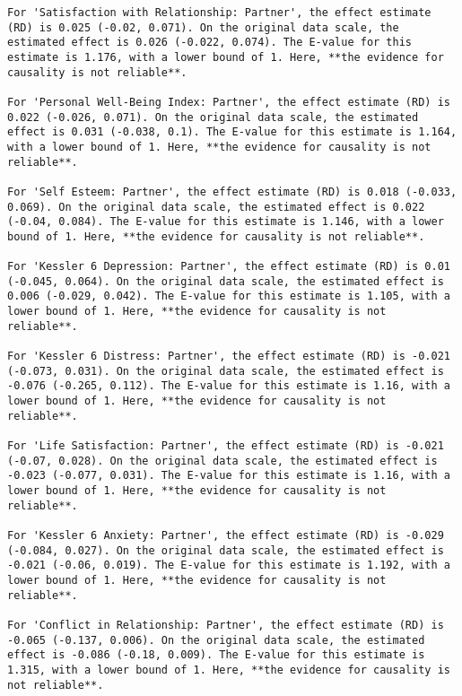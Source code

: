 \documentclass[
  singlecolumn]{article}
\begin{document}
\begin{verbatim}
For 'Satisfaction with Relationship: Partner', the effect estimate (RD) is 0.025 (-0.02, 0.071). On the original data scale, the estimated effect is 0.026 (-0.022, 0.074). The E-value for this estimate is 1.176, with a lower bound of 1. Here, **the evidence for causality is not reliable**.

For 'Personal Well-Being Index: Partner', the effect estimate (RD) is 0.022 (-0.026, 0.071). On the original data scale, the estimated effect is 0.031 (-0.038, 0.1). The E-value for this estimate is 1.164, with a lower bound of 1. Here, **the evidence for causality is not reliable**.

For 'Self Esteem: Partner', the effect estimate (RD) is 0.018 (-0.033, 0.069). On the original data scale, the estimated effect is 0.022 (-0.04, 0.084). The E-value for this estimate is 1.146, with a lower bound of 1. Here, **the evidence for causality is not reliable**.

For 'Kessler 6 Depression: Partner', the effect estimate (RD) is 0.01 (-0.045, 0.064). On the original data scale, the estimated effect is 0.006 (-0.029, 0.042). The E-value for this estimate is 1.105, with a lower bound of 1. Here, **the evidence for causality is not reliable**.

For 'Kessler 6 Distress: Partner', the effect estimate (RD) is -0.021 (-0.073, 0.031). On the original data scale, the estimated effect is -0.076 (-0.265, 0.112). The E-value for this estimate is 1.16, with a lower bound of 1. Here, **the evidence for causality is not reliable**.

For 'Life Satisfaction: Partner', the effect estimate (RD) is -0.021 (-0.07, 0.028). On the original data scale, the estimated effect is -0.023 (-0.077, 0.031). The E-value for this estimate is 1.16, with a lower bound of 1. Here, **the evidence for causality is not reliable**.

For 'Kessler 6 Anxiety: Partner', the effect estimate (RD) is -0.029 (-0.084, 0.027). On the original data scale, the estimated effect is -0.021 (-0.06, 0.019). The E-value for this estimate is 1.192, with a lower bound of 1. Here, **the evidence for causality is not reliable**.

For 'Conflict in Relationship: Partner', the effect estimate (RD) is -0.065 (-0.137, 0.006). On the original data scale, the estimated effect is -0.086 (-0.18, 0.009). The E-value for this estimate is 1.315, with a lower bound of 1. Here, **the evidence for causality is not reliable**.
\end{verbatim}
\end{document}
